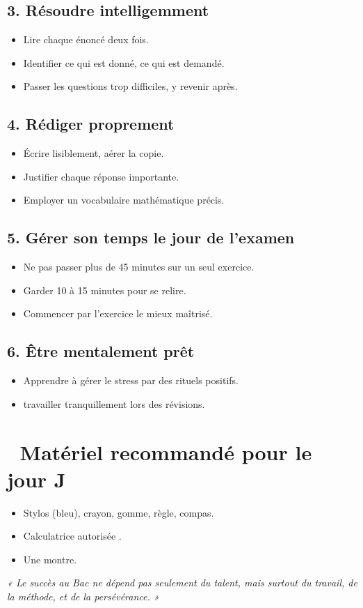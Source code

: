 \subsection*{3. Résoudre intelligemment}
\begin{itemize}[label=--]
    \item Lire chaque énoncé deux fois.
    \item Identifier ce qui est donné, ce qui est demandé.
    \item Passer les questions trop difficiles, y revenir après.
\end{itemize}

\subsection*{4. Rédiger proprement}
\begin{itemize}[label=--]
    \item Écrire lisiblement, aérer la copie.
    \item Justifier chaque réponse importante.
    \item Employer un vocabulaire mathématique précis.
\end{itemize}

\subsection*{5. Gérer son temps le jour de l’examen}
\begin{itemize}[label=--]
    \item Ne pas passer plus de 45 minutes sur un seul exercice.
    \item Garder 10 à 15 minutes pour se relire.
    \item Commencer par l’exercice le mieux maîtrisé.
\end{itemize}

\subsection*{6. Être mentalement prêt}
\begin{itemize}[label=--]
    \item Apprendre à gérer le stress par  des rituels positifs.
    \item travailler tranquillement lors des révisions.
\end{itemize}

\section*{📌 Matériel recommandé pour le jour J}
\begin{itemize}[label=--]
    \item Stylos (bleu), crayon, gomme, règle, compas.
    \item Calculatrice autorisée .
    \item Une montre.
\end{itemize}

\vspace{2em}
\begin{center}
    \textit{« Le succès au Bac ne dépend pas seulement du talent, mais surtout du travail, de la méthode, et de la persévérance. »}
\end{center}



